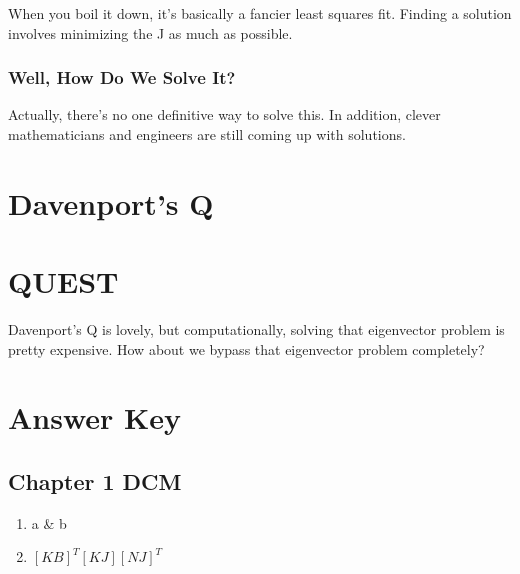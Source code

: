 \documentclass[a4paper,14pt]{extreport}
\begin{document}
When you boil it down, it's basically a fancier least squares fit. Finding a solution involves minimizing the J as much as possible.

\subsection{Well, How Do We Solve It?}
Actually, there's no one definitive way to solve this. In addition, clever mathematicians and engineers are still coming up with solutions.
\chapter{Davenport's Q}

\chapter{QUEST}
Davenport's Q is lovely, but computationally, solving that eigenvector problem is pretty expensive. How about we bypass that eigenvector problem completely?
\chapter{Answer Key}
\section{Chapter 1 DCM}
\begin{enumerate}
\item{a \& b}
\item{$[KB]^T[KJ][NJ]^T$}
\end{enumerate}
\end{document}
